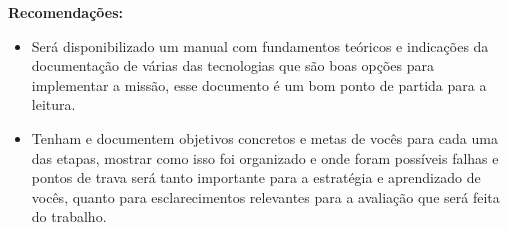 \textbf{Recomendações:}
\begin{itemize}
    \item Será disponibilizado um manual com fundamentos teóricos e indicações da documentação de várias das tecnologias que são boas opções para implementar a missão, esse documento é um bom ponto de partida para a leitura.
    \item Tenham e documentem objetivos concretos e metas de vocês para cada uma das etapas, mostrar como isso foi organizado e onde foram possíveis falhas e pontos de trava será tanto importante para a estratégia e aprendizado de vocês, quanto para esclarecimentos relevantes para a avaliação que será feita do trabalho.
\end{itemize}